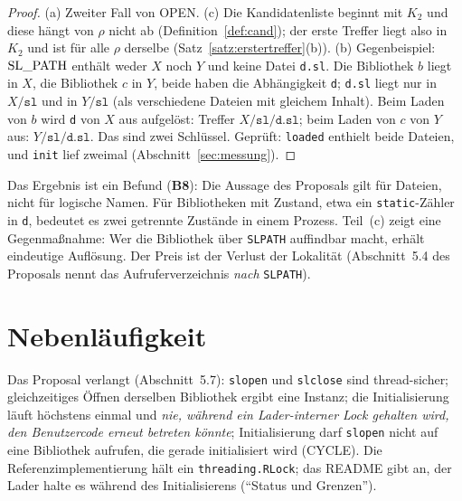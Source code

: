 \documentclass[a4paper,12pt,twoside]{report}
\DeclareRobustCommand{\_}{\ifmmode\mbox{\textunderscore}\else\textunderscore\allowbreak{}\fi}
\theoremstyle{definition}
\newcommand{\Bf}[1]{\textbf{B#1}}
\begin{document}
\begin{proof}
	(a) Zweiter Fall von OPEN. (c) Die Kandidatenliste beginnt mit $K_2$ und diese hängt von $\rho$ nicht ab (Definition~\ref{def:cand}); der erste Treffer liegt also in $K_2$ und ist für alle $\rho$ derselbe (Satz~\ref{satz:erstertreffer}(b)). (b) Gegenbeispiel: $\mathrm{SL\_PATH}$ enthält weder $X$ noch $Y$ und keine Datei \texttt{d.sl}. Die Bibliothek $b$ liegt in $X$, die Bibliothek $c$ in $Y$, beide haben die Abhängigkeit \texttt{d}; \texttt{d.sl} liegt nur in $X/\texttt{sl}$ und in $Y/\texttt{sl}$ (als verschiedene Dateien mit gleichem Inhalt). Beim Laden von $b$ wird \texttt{d} von $X$ aus aufgelöst: Treffer $X/\texttt{sl}/\texttt{d.sl}$; beim Laden von $c$ von $Y$ aus: $Y/\texttt{sl}/\texttt{d.sl}$. Das sind zwei Schlüssel. Geprüft: \texttt{\_loaded} enthielt beide Dateien, und \texttt{init} lief zweimal (Abschnitt~\ref{sec:messung}).
\end{proof}

Das Ergebnis ist ein Befund (\Bf{8}): Die Aussage des Proposals gilt für Dateien, nicht für logische Namen. Für Bibliotheken mit Zustand, etwa ein \texttt{static}-Zähler in \texttt{d}, bedeutet es zwei getrennte Zustände in einem Prozess. Teil~(c) zeigt eine Gegenmaßnahme: Wer die Bibliothek über \texttt{SL\_PATH} auffindbar macht, erhält eindeutige Auflösung. Der Preis ist der Verlust der Lokalität (Abschnitt~5.4 des Proposals nennt das Aufruferverzeichnis \emph{nach} \texttt{SL\_PATH}).

\section{Nebenläufigkeit}
\label{sec:nebenlaeufig}

Das Proposal verlangt (Abschnitt~5.7): \texttt{sl\_open} und \texttt{sl\_close} sind thread-sicher; gleichzeitiges Öffnen derselben Bibliothek ergibt eine Instanz; die Initialisierung läuft höchstens einmal und \emph{nie, während ein Lader-interner Lock gehalten wird, den Benutzercode erneut betreten könnte}; Initialisierung darf \texttt{sl\_open} nicht auf eine Bibliothek aufrufen, die gerade initialisiert wird (CYCLE). Die Referenzimplementierung hält ein \texttt{threading.RLock}; das README gibt an, der Lader halte es während des Initialisierens (``Status und Grenzen'').
\end{document}

